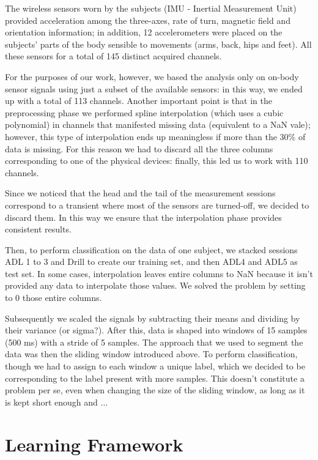 The wireless sensors worn by the subjects (IMU - Inertial Measurement Unit) provided acceleration among the three-axes, rate of turn, magnetic field and orientation information; in addition, 12 accelerometers were placed on the subjects' parts of the body sensible to movements (arms, back, hips and feet). All these sensors for a total of 145 distinct acquired channels. 

For the purposes of our work, however, we based the analysis only on on-body sensor signals using just a subset of the available sensors: in this way, we ended up with a total of 113 channels. Another important point is that in the preprocessing phase we performed spline interpolation (which uses a cubic polynomial) in channels that manifested missing data (equivalent to a NaN vale); however, this type of interpolation ends up meaningless if more than the 30\% of data is missing. For this reason we had to discard all the three columns corresponding to one of the physical devices: finally, this led us to work with 110 channels.

Since we noticed that the head and the tail of the measurement sessions correspond to a transient where most of the sensors are turned-off, we decided to discard them. In this way we ensure that the interpolation phase provides consistent results.

Then, to perform classification on the data of one subject, we stacked sessions ADL 1 to 3 and Drill to create our training set, and then ADL4 and ADL5 as test set. In some cases, interpolation leaves entire columns to NaN because it isn't provided any data to interpolate those values. We solved the problem by setting to 0 those entire columns.

Subsequently we scaled the signals by subtracting their means and dividing by their variance (or sigma?). After this, data is shaped into windows of 15 samples (500 ms) with a stride of 5 samples. The approach that we used to segment the data was then the sliding window introduced above. To perform classification, though we had to assign to each window a unique label, which we decided to be corresponding to the label present with more samples. This doesn't constitute a problem per se, even when changing the size of the sliding window, as long as it is kept short enough and ...


\section{Learning Framework}
\label{sec:learning_framework}


